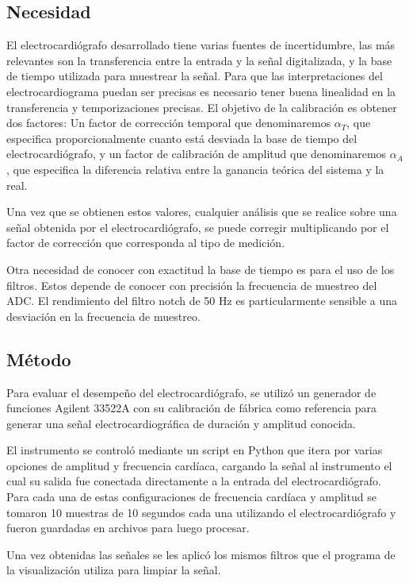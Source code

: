 \documentclass[conference]{IEEEtran}
\begin{document}
\subsection{Necesidad}

El electrocardiógrafo desarrollado tiene varias fuentes de incertidumbre, las más
relevantes son la transferencia entre la entrada y la señal digitalizada, y la base
de tiempo utilizada para muestrear la señal. Para que las interpretaciones del
electrocardiograma puedan ser precisas es necesario tener buena linealidad en la 
transferencia y temporizaciones precisas. El objetivo de la calibración es obtener
dos factores: Un factor de corrección temporal que denominaremos $\alpha_T$,
que especifica proporcionalmente cuanto está desviada la base de tiempo del
electrocardiógrafo, y un factor de calibración de amplitud que denominaremos
$\alpha_A$, que especifica la diferencia relativa entre la ganancia teórica del
sistema y la real.

Una vez que se obtienen estos valores, cualquier análisis que se realice sobre
una señal obtenida por el electrocardiógrafo, se puede corregir multiplicando por
el factor de corrección que corresponda al tipo de medición.

Otra necesidad de conocer con exactitud la base de tiempo es para el uso de los
filtros. Estos depende de conocer con precisión la frecuencia de muestreo del ADC.
El rendimiento del filtro notch de 50 Hz es particularmente sensible a una
desviación en la frecuencia de muestreo.


\subsection{Método}


Para evaluar el desempeño del electrocardiógrafo, se utilizó un generador de funciones
Agilent 33522A con su calibración de fábrica como referencia para generar una señal
electrocardiográfica de duración y amplitud conocida.

El instrumento se controló mediante un script en Python que itera por varias
opciones de amplitud y frecuencia cardíaca, cargando la señal al instrumento el cual 
su salida fue conectada directamente a la entrada del electrocardiógrafo. Para cada 
una de estas configuraciones de frecuencia cardíaca y amplitud se tomaron 10
muestras de 10 segundos cada una utilizando el electrocardiógrafo y fueron guardadas
en archivos para luego procesar.

Una vez obtenidas las señales se les aplicó los mismos filtros que el programa de
la visualización utiliza para limpiar la señal.
\end{document}
